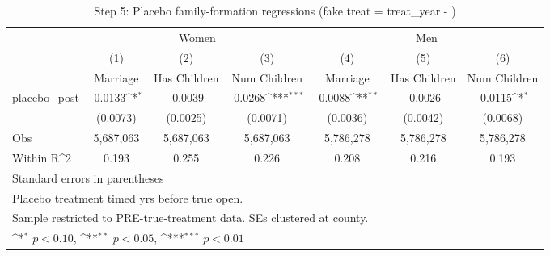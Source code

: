 \begin{table}[htbp]\centering
\def\sym#1{\ifmmode^{#1}\else\(^{#1}\)\fi}
\caption{Step 5: Placebo family-formation regressions (fake treat = treat\_year - )}
\begin{tabular}{l*{6}{c}}
\hline\hline
            &\multicolumn{3}{c}{Women}                                        &\multicolumn{3}{c}{Men}                                          \\\cmidrule(lr){2-4}\cmidrule(lr){5-7}
            &\multicolumn{1}{c}{(1)}&\multicolumn{1}{c}{(2)}&\multicolumn{1}{c}{(3)}&\multicolumn{1}{c}{(4)}&\multicolumn{1}{c}{(5)}&\multicolumn{1}{c}{(6)}\\
            &\multicolumn{1}{c}{Marriage}&\multicolumn{1}{c}{Has Children}&\multicolumn{1}{c}{Num Children}&\multicolumn{1}{c}{Marriage}&\multicolumn{1}{c}{Has Children}&\multicolumn{1}{c}{Num Children}\\
\hline
placebo\_post&     -0.0133\sym{*}  &     -0.0039         &     -0.0268\sym{***}&     -0.0088\sym{**} &     -0.0026         &     -0.0115\sym{*}  \\
            &    (0.0073)         &    (0.0025)         &    (0.0071)         &    (0.0036)         &    (0.0042)         &    (0.0068)         \\
\hline
Obs         &   5,687,063         &   5,687,063         &   5,687,063         &   5,786,278         &   5,786,278         &   5,786,278         \\
Within R^2  &       0.193         &       0.255         &       0.226         &       0.208         &       0.216         &       0.193         \\
\hline\hline
\multicolumn{7}{l}{\footnotesize Standard errors in parentheses}\\
\multicolumn{7}{l}{\footnotesize Placebo treatment timed  yrs before true open.}\\
\multicolumn{7}{l}{\footnotesize Sample restricted to PRE-true-treatment data.  SEs clustered at county.}\\
\multicolumn{7}{l}{\footnotesize \sym{*} \(p<0.10\), \sym{**} \(p<0.05\), \sym{***} \(p<0.01\)}\\
\end{tabular}
\end{table}
